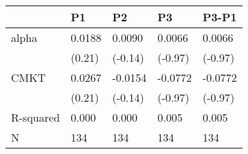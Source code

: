 \begin{tabular}{lllll}
\toprule
 & P1 & P2 & P3 & P3-P1 \\
\midrule
alpha & 0.0188 & 0.0090 & 0.0066 & 0.0066 \\
  & (0.21) & (-0.14) & (-0.97) & (-0.97) \\
CMKT & 0.0267 & -0.0154 & -0.0772 & -0.0772 \\
  & (0.21) & (-0.14) & (-0.97) & (-0.97) \\
R-squared & 0.000 & 0.000 & 0.005 & 0.005 \\
N & 134 & 134 & 134 & 134 \\
\bottomrule
\end{tabular}
